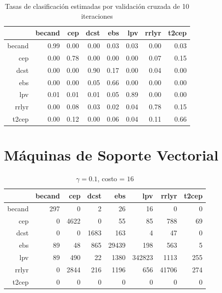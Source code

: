 \documentclass[letterpaper,12pt]{book}
\begin{document}
\begin{table}[ht]
\centering
\caption{Tasas de clasificación estimadas por validación cruzada de 10 iteraciones} 
\label{table:cmCvart}
\begin{tabular}{rrrrrrrr}
  \hline
 & becand & cep & dcst & ebs & lpv & rrlyr & t2cep \\ 
  \hline
becand & 0.99 & 0.00 & 0.00 & 0.03 & 0.03 & 0.00 & 0.03 \\ 
  cep & 0.00 & 0.78 & 0.00 & 0.00 & 0.00 & 0.07 & 0.15 \\ 
  dcst & 0.00 & 0.00 & 0.90 & 0.17 & 0.00 & 0.04 & 0.00 \\ 
  ebs & 0.00 & 0.00 & 0.05 & 0.66 & 0.00 & 0.00 & 0.00 \\ 
  lpv & 0.01 & 0.01 & 0.01 & 0.05 & 0.89 & 0.00 & 0.00 \\ 
  rrlyr & 0.00 & 0.08 & 0.03 & 0.02 & 0.04 & 0.78 & 0.15 \\ 
  t2cep & 0.00 & 0.12 & 0.00 & 0.06 & 0.04 & 0.11 & 0.66 \\ 
   \hline
\end{tabular}
\end{table}

\section{Máquinas de Soporte Vectorial}

\begin{table}[ht]
\centering
\caption{$\gamma = 0.1$, costo = $16$} 
\label{table:cmSvm}
\begin{tabular}{rrrrrrrr}
  \hline
 & becand & cep & dcst & ebs & lpv & rrlyr & t2cep \\ 
  \hline
becand & 297 &   0 &   2 &  26 &  16 &   0 &   0 \\ 
  cep &   0 & 4622 &   0 &  55 &  85 & 788 &  69 \\ 
  dcst &   0 &   0 & 1683 & 163 &   4 &  47 &   0 \\ 
  ebs &  89 &  48 & 865 & 29439 & 198 & 563 &   5 \\ 
  lpv &  89 & 490 &  22 & 1380 & 342823 & 1113 & 255 \\ 
  rrlyr &   0 & 2844 & 216 & 1196 & 656 & 41706 & 274 \\ 
  t2cep &   0 &   0 &   0 &   0 &   0 &   0 &   0 \\ 
   \hline
\end{tabular}
\end{table}
\end{document}
